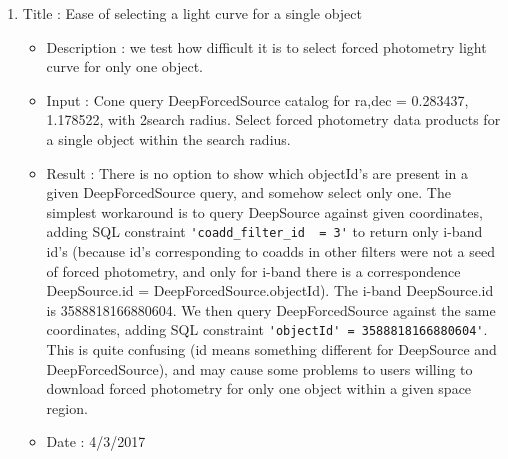 \documentclass[DM,lsstdraft,toc]{lsstdoc}
\begin{document}
\begin{enumerate}
    \item Title : Ease of selecting a light curve for a single object
    \begin{itemize}
    	\item Description : we test how  difficult it is to select forced photometry light curve for only one object.
    	\item Input : Cone query DeepForcedSource catalog for  ra,dec = 0.283437\degree, 1.178522\degree, with 2\arcsec  search radius. Select forced photometry data products for a single object within the search radius.
    	\item Result : There is no option to show which objectId's are present in a given DeepForcedSource query, and somehow select only one.  The simplest workaround is to query  DeepSource against given coordinates,   adding SQL constraint  \verb|'coadd_filter_id  = 3'| to return only i-band id's (because id's corresponding to coadds in other filters were not a seed of forced photometry, and only  for i-band there is a correspondence DeepSource.id = DeepForcedSource.objectId). The i-band DeepSource.id is  3588818166880604. We then query DeepForcedSource against the same coordinates, adding SQL constraint \verb|'objectId' = 3588818166880604'|. This is quite confusing (id means something different for DeepSource and DeepForcedSource), and may cause some problems to users willing to download forced photometry for only one object within a given space region.
      \item Date : 4/3/2017
    \end{itemize}
\end{enumerate}
\end{document}
